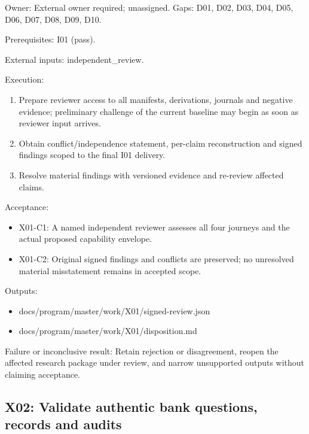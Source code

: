 \documentclass[
  11pt,
  a4paper,
]{article}
\providecommand{\tightlist}{%
  \setlength{\itemsep}{0pt}\setlength{\parskip}{0pt}}
\begin{document}
Owner: External owner required; unassigned. Gaps: D01, D02, D03, D04,
D05, D06, D07, D08, D09, D10.

Prerequisites: I01 (pass).

External inputs: independent\_review.

Execution:

\begin{enumerate}
\def\labelenumi{\arabic{enumi}.}
\tightlist
\item
  Prepare reviewer access to all manifests, derivations, journals and
  negative evidence; preliminary challenge of the current baseline may
  begin as soon as reviewer input arrives.
\item
  Obtain conflict/independence statement, per-claim reconstruction and
  signed findings scoped to the final I01 delivery.
\item
  Resolve material findings with versioned evidence and re-review
  affected claims.
\end{enumerate}

Acceptance:

\begin{itemize}
\tightlist
\item
  X01-C1: A named independent reviewer assesses all four journeys and
  the actual proposed capability envelope.
\item
  X01-C2: Original signed findings and conflicts are preserved; no
  unresolved material misstatement remains in accepted scope.
\end{itemize}

Outputs:

\begin{itemize}
\tightlist
\item
  docs/program/master/work/X01/signed-review.json
\item
  docs/program/master/work/X01/disposition.md
\end{itemize}

Failure or inconclusive result: Retain rejection or disagreement, reopen
the affected research package under review, and narrow unsupported
outputs without claiming acceptance.

\hypertarget{x02-validate-authentic-bank-questions-records-and-audits}{%
\subsection{X02: Validate authentic bank questions, records and
audits}\label{x02-validate-authentic-bank-questions-records-and-audits}}
\end{document}
